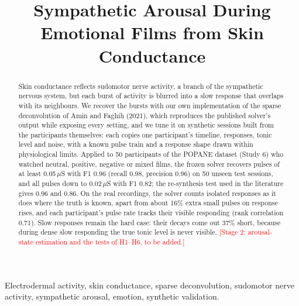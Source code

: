 \documentclass[conference]{IEEEtran}
\newcommand{\uS}{\,$\mu$S}
\newcommand{\todo}[1]{\textcolor{red}{[#1]}}
\begin{document}
\title{Sympathetic Arousal During Emotional Films from Skin Conductance}

\author{
}

\maketitle

\begin{abstract}
Skin conductance reflects sudomotor nerve activity, a branch of the sympathetic nervous system,
but each burst of activity is blurred into a slow response that overlaps with its neighbours. We
recover the bursts with our own implementation of the sparse deconvolution of Amin and Faghih
(2021), which reproduces the published solver's output while exposing every setting, and we tune
it on synthetic sessions built from the participants themselves: each copies one participant's
timeline, responses, tonic level and noise, with a known pulse train and a response shape drawn
within physiological limits. Applied to 50 participants of the POPANE dataset (Study 6) who
watched neutral, positive, negative or mixed films, the frozen solver recovers pulses of at least
0.05\uS{} with F1 0.96 (recall 0.98, precision 0.96) on 50 unseen test sessions, and all pulses
down to 0.02\uS{} with F1 0.82; the re-synthesis test used in the literature gives 0.96 and 0.86.
On the real recordings, the solver counts isolated responses as it does where the truth is known,
apart from about 16\% extra small pulses on response rises, and each participant's pulse rate
tracks their visible responding (rank correlation 0.71). Slow responses remain the hard case:
their decays come out 37\% short, because during dense slow responding the true tonic level is
never visible. \todo{Stage 2: arousal-state estimation and the tests of H1--H6, to be added.}
\end{abstract}

\begin{IEEEkeywords}
Electrodermal activity, skin conductance, sparse deconvolution, sudomotor nerve activity,
sympathetic arousal, emotion, synthetic validation.
\end{IEEEkeywords}
\end{document}
